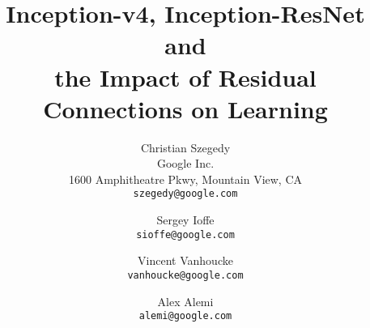 \documentclass[10pt,twocolumn,letterpaper]{article}
\begin{document}
\title{Inception-v4, Inception-ResNet and\\the Impact of Residual Connections on Learning}

\author{Christian Szegedy\\
Google Inc.\\
1600 Amphitheatre Pkwy, Mountain View, CA\\
{\tt\small szegedy@google.com}
\and
Sergey Ioffe\\
{\tt\small sioffe@google.com}
\and
Vincent Vanhoucke\\
{\tt\small vanhoucke@google.com}
\and
Alex Alemi\\
{\tt\small alemi@google.com}
}

\maketitle

\begin{abstract}

\end{abstract}







%
%
%
%
%
%
%
%
%


{\small


}
\end{document}
